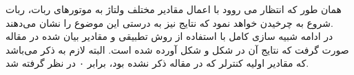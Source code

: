 همان طور که انتظار می روود با اعمال مقادیر مختلف ولتاژ به موتورهای ربات، ربات شروع به چرخیدن خواهد نمود که نتایج نیز به درستی این موضوع را نشان می‌دهند.\\
در ادامه شبیه سازی کامل با استفاده از روش تطبیقی و مقادیر بیان شده در مقاله صورت گرفت که نتایج آن در شکل  و شکل  آورده شده است. البته لازم به ذکر می‌باشد که مقادیر اولیه کنترلر که در مقاله ذکر نشده بود، برابر ۰ در نظر گرفته شد. \\
\begin{figure}[h]
	\begin{center}
		\hspace*{0.2cm}
\end{center}
\end{figure}
